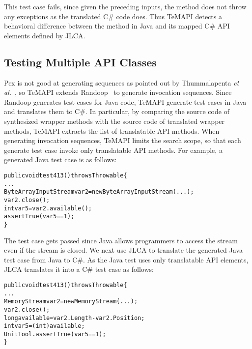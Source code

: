 This test case fails, since given the preceding inputs, the  method does not throw any exceptions as the translated C\# code does. Thus TeMAPI detects a behavioral difference between the  method in Java and its mapped C\# API elements defined by JLCA.

\subsection{Testing Multiple API Classes}

Pex is not good at generating sequences as pointed out by Thummalapenta \emph{et al.}~\cite{thummalapenta09:mseqgen}, so TeMAPI extends Randoop~\cite{pacheco2007feedback} to generate invocation sequences. Since Randoop generates test cases for Java code, TeMAPI generate test cases in Java and translates them to C\#. In particular, by comparing the source code of synthesized wrapper methods with the source code of translated wrapper methods, TeMAPI extracts the list of translatable API methods. When generating invocation sequences, TeMAPI limits the search scope, so that each generate test case invoke only translatable API methods. For example, a generated Java test case is as follows:

\begin{CodeOut}\vspace*{-1ex}
\begin{alltt}
public void test413() throws Throwable\{
  ...
  ByteArrayInputStream var2=new ByteArrayInputStream(...);
  var2.close();
  int var5=var2.available();
  assertTrue(var5 == 1);
\}
\end{alltt}
\end{CodeOut}\vspace*{-2ex}


The test case gets passed since Java allows programmers to access the stream even if the stream is closed. We next use JLCA to translate the generated Java test case from Java to C\#. As the Java test uses only translatable API elements, JLCA translates it into a C\# test case as follows:

\begin{CodeOut}\vspace*{-1ex}
\begin{alltt}
public void test413() throws Throwable\{
  ...
  MemoryStream var2 = new MemoryStream(...);
  var2.close();
  long available = var2.Length - var2.Position;
  int var5 = (int) available;
  UnitTool.assertTrue(var5 == 1);
\}
\end{alltt}
\end{CodeOut}\vspace*{-2ex}

